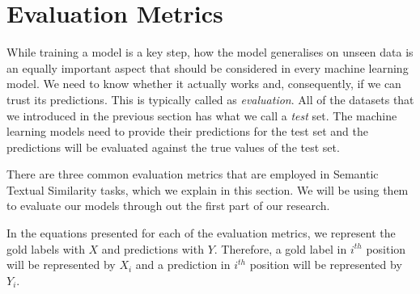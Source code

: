 \section{Evaluation Metrics}
While training a model is a key step, how the model generalises on unseen data is an equally important aspect that should be considered in every machine learning model. We need to know whether it actually works and, consequently, if we can trust its predictions. This is typically called as \textit{evaluation}. All of the datasets that we introduced in the previous section has what we call a \textit{test} set. The machine learning models need to provide their predictions for the test set and the predictions will be evaluated against the true values of the test set. 

There are three common evaluation metrics that are employed in Semantic Textual Similarity tasks, which we explain in this section. We will be using them to evaluate our models through out the first part of our research. 

In the equations presented for each of the evaluation metrics, we represent the gold labels with $X$ and predictions with $Y$. Therefore, a gold label in $i^{th}$ position will be represented by $X_i$ and a prediction in $i^{th}$ position will be represented by $Y_i$. 

